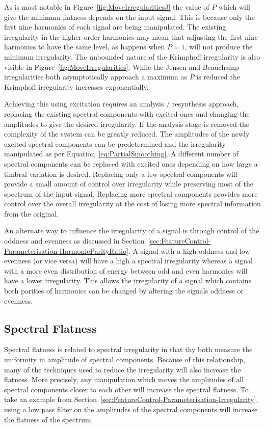 		As is most notable in Figure~\ref{fig:MoveIrregularitiesJ} the value of $P$ which will give the minimum
		flatness depends on the input signal. This is because only the first nine harmonics of each signal are
		being manipulated. The existing irregularity in the higher order harmonics may mean that adjusting the
		first nine harmonics to have the same level, as happens when $P = 1$, will not produce the minimum
		irregularity. The unbounded nature of the Krimphoff irregularity is also visible in
		Figure~\ref{fig:MoveIrregularities}.  While the Jensen and Beauchamp irregularities both asymptotically
		approach a maximum as $P$ is reduced the Krimphoff irregularity increases exponentially.

		Achieving this using excitation requires an analysis / resynthesis approach, replacing the existing
		spectral components with excited ones and changing the amplitudes to give the desired irregularity. If the
		analysis stage is removed the complexity of the system can be greatly reduced. The amplitudes of the newly
		excited spectral components can be predetermined and the irregularity manipulated as per
		Equation~\ref{eq:PartialSmoothing}. A different number of spectral components can be replaced with excited
		ones depending on how large a timbral variation is desired. Replacing only a few spectral components will
		provide a small amount of control over irregularity while preserving most of the spectrum of the input
		signal. Replacing more spectral components provides more control over the overall irregularity at the cost
		of losing more spectral information from the original.

		An alternate way to influence the irregularity of a signal is through control of the oddness and evenness
		as discussed in Section~\ref{sec:FeatureControl-Parameterisation-HarmonicParityRatio}. A signal with a high
		oddness and low evenness (or vice versa) will have a high a spectral irregularity whereas a signal with a
		more even distribution of energy between odd and even harmonics will have a lower irregularity. This allows
		the irregularity of a signal which contains both parities of harmonics can be changed by altering the
		signals oddness or evenness.

	\subsection{Spectral Flatness}
	\label{sec:FeatureControl-Parameterisation-Flatness}
		Spectral flatness is related to spectral irregularity in that thy both measure the uniformity in amplitude
		of spectral components. Because of this relationship, many of the techniques used to reduce the
		irregularity will also increase the flatness. More precisely, any manipulation which moves the amplitudes
		of all spectral components closer to each other will increase the spectral flatness. To take an example
		from Section~\ref{sec:FeatureControl-Parameterisation-Irregularity}, using a low pass filter on the
		amplitudes of the spectral components will increase the flatness of the spectrum. 
		
